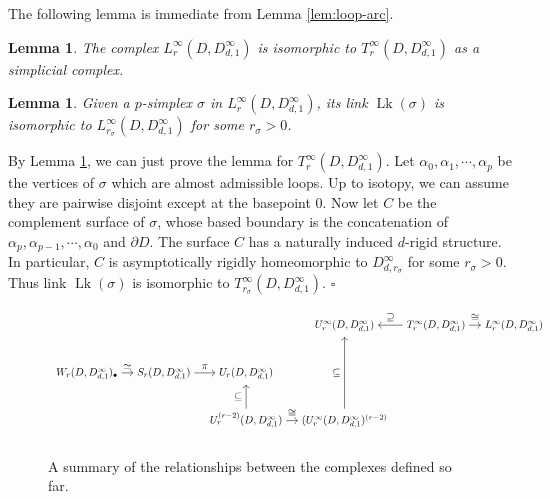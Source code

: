 \documentclass[11pt, a4paper]{amsart}
\newtheorem{lem}[thm]{Lemma}
\theoremstyle{definition}
\DeclareMathOperator{\Lk}{Lk}
\def\Proof{\noindent{\bf Proof.}\quad}
\def\qed{\hfill$\square$\smallskip}
\begin{document}
 
The following lemma is immediate from Lemma \ref{lem:loop-arc}. 

\begin{lem}\label{lem-id-T-L}
The complex $L_r^{\infty}(D,D^{\infty}_{d,1})$ is isomorphic to $T_r^{\infty}(D,D^{\infty}_{d,1})$ as a simplicial complex.
\end{lem}


\begin{lem}\label{lem-link-loli}
Given a $p$-simplex $\sigma$ in $L_r^{\infty}(D,D^{\infty}_{d,1})$, its link $\Lk({\sigma})$ is isomorphic to $L_{r_\sigma}^{\infty}(D,D^{\infty}_{d,1})$ for some $r_\sigma>0$.
\end{lem}
\Proof
By Lemma \ref{lem-id-T-L}, we can just prove the lemma for $T_r^{\infty}(D,D^{\infty}_{d,1})$. Let $\alpha_0,\alpha_1,\cdots,\alpha_p$ be the vertices of  $\sigma$ which are almost admissible loops. Up to isotopy, we can assume they are pairwise disjoint except at the basepoint $0$. Now let $C$ be the complement surface of  $\sigma$, whose based boundary is the concatenation of  $\alpha_p,\alpha_{p-1},\cdots,\alpha_0$ and $\partial D$. The surface $C$ has a naturally induced $d$-rigid structure. In particular, $C$ is asymptotically rigidly homeomorphic to $D^{\infty}_{d,r_\sigma}$ for some $r_\sigma>0$. Thus link $\Lk({\sigma})$ is isomorphic to $T_{r_\sigma}^{\infty}(D,D^{\infty}_{d,1})$.
\qed



\begin{figure}[ht]
 \[
   \begin{tikzpicture}[scale=0.85,every node/.style={thick,scale=0.85}]
    \matrix (m) [matrix of math nodes, column sep=1em, row sep=2em, text depth=.5em, text height=1em, ampersand replacement=\&]
    {
     \&  \&  \& U_r^\infty(D,D^{\infty}_{d,1}) \& T_r^\infty(D,D^{\infty}_{d,1})    \& L_r^\infty(D,D^{\infty}_{d,1}) \\
    W_r(D,D^{\infty}_{d,1})_\bullet  \& S_r(D,D^{\infty}_{d,1}) \& U_r(D,D^{\infty}_{d,1})\\ 
     \&  \& U_r^{(r-2)}(D,D^{\infty}_{d,1})\& (U_r^{\infty}(D,D^{\infty}_{d,1})^{(r-2)}  \\};
    \path[->]
     (m-1-5) edge node[above]{$\supseteq$}  (m-1-4)
       (m-1-5) edge node[above]{$\cong$}  (m-1-6)
    (m-2-2) edge node[above]{$\pi$}  (m-2-3)
    (m-3-3) edge node[left]{$\subseteq$}  (m-2-3)
     (m-3-3) edge node[above]{$\cong$}  (m-3-4)
       (m-3-4) edge node[left]{$\subseteq$}  (m-1-4)
    (m-2-1) edge node[above]{$\simeq$}  (m-2-2);



   \end{tikzpicture}
  \]
    \caption{A summary of the relationships between the complexes defined so far.}
    \label{fig:sumrelations}
\end{figure}
\end{document}
